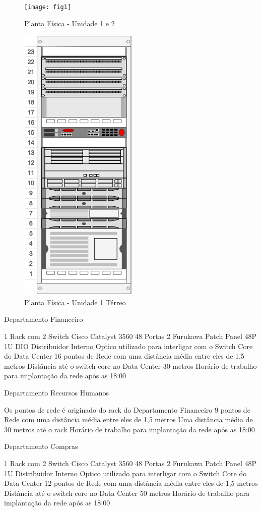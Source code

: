 \documentclass[	DIV=calc,%
							paper=a4,%
							fontsize=12pt,%
							onecolumn]{scrartcl}	 					%
\begin{document}
\begin{figure}
	\centering
	\texttt{[image: fig1]}
	\caption{Planta Física - Unidade 1 e 2}
	\label{fig1}
\end{figure}

\begin{figure}
	\centering
	\includegraphics[]{fig2}
	\caption{Planta Física - Unidade 1 Térreo}
	\label{fig2}
\end{figure}

Departamento Financeiro

1 Rack com 2 Switch Cisco Catalyst 3560 48 Portas
2 Furukawa Patch Panel 48P 1U
DIO Distribuidor Interno Optico utilizado para interligar com o Switch Core do Data Center
16 pontos de Rede com uma distância média entre eles de 1,5 metros
Distância até o switch core no Data Center 30 metros
Horário de trabalho para implantação da rede após as 18:00

	
	 Departamento Recursos Humanos

Os pontos de rede é originado do rack do Departamento Financeiro
9 pontos de Rede com uma distância média entre eles de 1,5 metros
Uma distância média de 30 metros até o rack
Horário de trabalho para implantação da rede após as 18:00

	 Departamento Compras

1 Rack com 2 Switch Cisco Catalyst 3560 48 Portas
2 Furukawa Patch Panel 48P 1U
Distribuidor Interno Optico utilizado para interligar com o Switch Core do Data Center
12 pontos de Rede com uma distância média entre eles de 1,5 metros
Distância até o switch core no Data Center 50 metros
Horário de trabalho para implantação da rede após as 18:00
\end{document}
